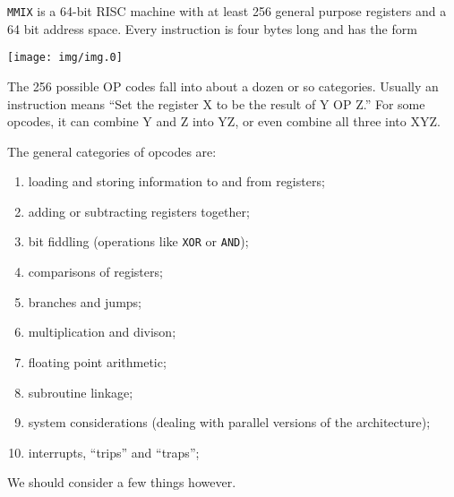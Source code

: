 
{\tt MMIX} is a 64-bit RISC machine with at least 256 general
purpose registers and a 64 bit address space. Every instruction
is four bytes long and has the form
\begin{center}
\texttt{[image: img/img.0]}
\end{center}
\noindent The 256 possible OP codes fall into about a dozen or so
categories. Usually an instruction means ``Set the register X to
be the result of Y OP Z.'' For some opcodes, it can combine Y and
Z into YZ, or even combine all three into XYZ.

The general categories of opcodes are:
\begin{enumerate}
\item loading and storing information to and from registers;
\item adding or subtracting registers together;
\item bit fiddling (operations like {\tt XOR} or {\tt AND});
\item comparisons of registers;
\item branches and jumps;
\item multiplication and divison;
\item floating point arithmetic;
\item subroutine linkage;
\item system considerations (dealing with parallel versions of
  the architecture);
\item interrupts, ``trips'' and ``traps'';
\end{enumerate}
We should consider a few things however.

